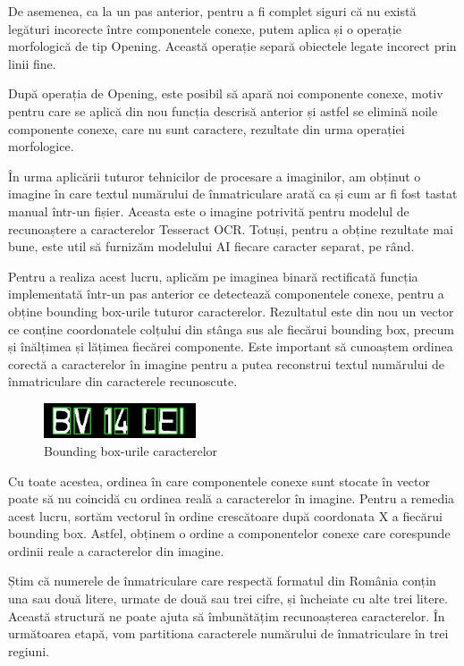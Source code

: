 \documentclass[a4paper,12pt]{report}
\begin{document}
De asemenea, ca la un pas anterior, pentru a fi complet siguri că nu există legături incorecte între componentele conexe, putem aplica și o operație morfologică de tip Opening. Această operație separă obiectele legate incorect prin linii fine.

După operația de Opening, este posibil să apară noi componente conexe, motiv pentru care se aplică din nou funcția descrisă anterior și astfel se elimină noile componente conexe, care nu sunt caractere, rezultate din urma operației morfologice.

În urma aplicării tuturor tehnicilor de procesare a imaginilor, am obținut o imagine în care textul numărului de înmatriculare arată ca și cum ar fi fost tastat manual într-un fișier. Aceasta este o imagine potrivită pentru modelul de recunoaștere a caracterelor Tesseract OCR. Totuși, pentru a obține rezultate mai bune, este util să furnizăm modelului AI fiecare caracter separat, pe rând.

Pentru a realiza acest lucru, aplicăm pe imaginea binară rectificată funcția implementată într-un pas anterior ce detectează componentele conexe, pentru a obține bounding box-urile tuturor caracterelor. Rezultatul este din nou un vector ce conține coordonatele colțului din stânga sus ale fiecărui bounding box, precum și înălțimea și lățimea fiecărei componente. Este important să cunoaștem ordinea corectă a caracterelor în imagine pentru a putea reconstrui textul numărului de înmatriculare din caracterele recunoscute.

\begin{figure}[h]
    \centering
    \includegraphics[width=0.4\textwidth]{images/chars.jpg}
    \caption{Bounding box-urile caracterelor}
\end{figure}
\FloatBarrier

Cu toate acestea, ordinea în care componentele conexe sunt stocate în vector poate să nu coincidă cu ordinea reală a caracterelor în imagine. Pentru a remedia acest lucru, sortăm vectorul în ordine crescătoare după coordonata X a fiecărui bounding box. Astfel, obținem o ordine a componentelor conexe care corespunde ordinii reale a caracterelor din imagine.

Știm că numerele de înmatriculare care respectă formatul din România conțin una sau două litere, urmate de două sau trei cifre, și încheiate cu alte trei litere. Această structură ne poate ajuta să îmbunătățim recunoașterea caracterelor. În următoarea etapă, vom partitiona caracterele numărului de înmatriculare în trei regiuni.
\end{document}
